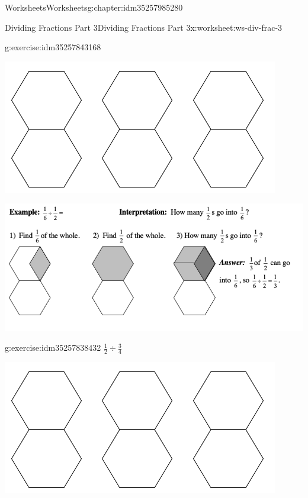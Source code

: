 \documentclass[twoside,11pt,]{book}
\begin{document}
\begin{chapterptx}{Worksheets}{}{Worksheets}{}{}{g:chapter:idm35257985280}
\begin{worksheet-section-numberless}{Dividing Fractions Part 3}{}{Dividing Fractions Part 3}{}{}{x:worksheet:ws-div-frac-3}
\begin{divisionexercise}{1}{}{}{g:exercise:idm35257843168}
\begin{sidebyside}{1}{0.15}{0.15}{0}
\begin{sbspanel}{0.7}
\includegraphics[width=1\linewidth]{images/3-double-hexagons.png}
\end{sbspanel}%
\end{sidebyside}%
\end{divisionexercise}%
\clearpage
\begin{introduction}{}%
\begin{sidebyside}{1}{0}{0}{0}%
\begin{sbspanel}{1}%
\includegraphics[width=1\linewidth]{images/frac-div-hex-2.png}
\end{sbspanel}%
\end{sidebyside}%
\end{introduction}%
\begin{divisionexercise}{2}{}{}{g:exercise:idm35257838432}%
\(\frac{1}{2} \div \frac{3}{4} \)%
\begin{sidebyside}{1}{0.15}{0.15}{0}%
\begin{sbspanel}{0.7}%
\includegraphics[width=1\linewidth]{images/3-double-hexagons.png}

\end{sbspanel}
\end{sidebyside}
\end{divisionexercise}
\end{worksheet-section-numberless}
\end{chapterptx}
\end{document}
